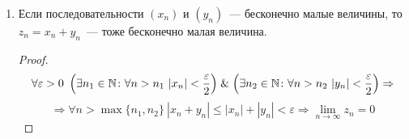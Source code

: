 \begin{enumerate}
	\item Если последовательности $(x_n)$ и $(y_n)$~--- бесконечно малые величины, то $z_n = x_n + y_n$~--- тоже бесконечно малая величина.
	\begin{proof}
	\begin{equation*}
	\forall \varepsilon > 0 \
	\left( \exists n_1 \in \mathbb N \colon \forall n > n_1 \ |x_n| < \frac\varepsilon2 \right) \mathrel{\&}
	\left( \exists n_2 \in \mathbb N \colon \forall n > n_2 \ |y_n| < \frac\varepsilon2 \right) \Rightarrow
	\end{equation*}
	\begin{equation*}
	\Rightarrow \forall n > \max \{ n_1, n_2 \} \ |x_n + y_n| \leqslant |x_n| + |y_n| < \varepsilon \Rightarrow
	\lim_{n \to \infty} z_n = 0
	\end{equation*}
	\end{proof}
\end{enumerate}

